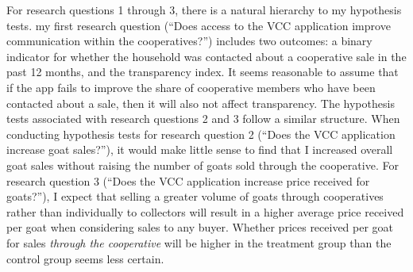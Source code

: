 \documentclass[11pt]{article}
\begin{document}
For research questions 1 through 3, there is a natural hierarchy to my hypothesis tests. my first research question (``Does access to the VCC application improve communication within the cooperatives?'') includes two outcomes: a binary indicator for whether the household was contacted about a cooperative sale in the past 12 months, and the transparency index. It seems reasonable to assume that if the app fails to improve the share of cooperative members who have been contacted about a sale, then it will also not affect transparency. The hypothesis tests associated with research questions 2 and 3 follow a similar structure. When conducting hypothesis tests for research question 2 (``Does the VCC application increase goat sales?''), it would make little sense to find that I increased overall goat sales without raising the number of goats sold through the cooperative. %
For research question 3 (``Does the VCC application increase price received for goats?''), I expect that selling a greater volume of goats through cooperatives rather than individually to collectors will result in a higher average price received per goat when considering sales to any buyer. Whether prices received per goat for sales \textit{through the cooperative} will be higher in the treatment group than the control group seems less certain. %
\end{document}
